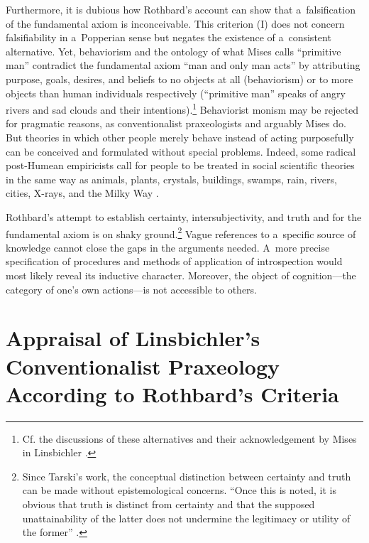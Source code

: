 Furthermore, it is dubious how Rothbard's account can show that a~falsification of the fundamental axiom is inconceivable. This criterion (I) does not concern falsifiability in a~Popperian sense but negates the existence of a~consistent alternative. Yet, behaviorism and the ontology of what Mises calls ``primitive man'' contradict the fundamental axiom ``man and only man acts'' by attributing purpose, goals, desires, and beliefs to no objects at all (behaviorism) or to more objects than human individuals respectively (``primitive man'' speaks of angry rivers and sad clouds and their intentions).\footnote{Cf. the discussions of these alternatives and their acknowledgement by Mises in Linsbichler 
\parencites*[][]{linsbichler_was_2017}[][]{linsbichler_austrian_2021}.%
} Behaviorist monism may be rejected for pragmatic reasons, as conventionalist praxeologists and arguably Mises do. But theories in which other people merely behave instead of acting purposefully can be conceived and formulated without special problems. Indeed, some radical post-Humean empiricists call for people to be treated in social scientific theories in the same way as animals, plants, crystals, buildings, swamps, rain, rivers, cities, X-rays, and the Milky Way 
\parencites[see][]{neurath_foundations_1944}[][]{neurath_foundations_1970}.%




Rothbard's attempt to establish certainty, intersubjectivity, and truth and for the fundamental axiom is on shaky ground.\footnote{Since Tarski's work, the conceptual distinction between certainty and truth can be made without epistemological concerns. ``Once this is noted, it is obvious that truth is distinct from certainty and that the supposed unattainability of the latter does not undermine the legitimacy or utility of the former'' 
\parencite[][p.32]{soames_understanding_1999}.%
} Vague references to a~specific source of knowledge cannot close the gaps in the arguments needed. A~more precise specification of procedures and methods of application of introspection would most likely reveal its inductive character. Moreover, the object of cognition---the category of one's own actions---is not accessible to others.



\section{Appraisal of Linsbichler's Conventionalist Praxeology According to Rothbard's Criteria}

